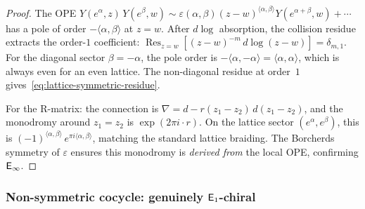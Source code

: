 \begin{proof}
The OPE $Y(e^\alpha,z)\,Y(e^\beta,w) \sim
\varepsilon(\alpha,\beta)(z-w)^{\langle\alpha,\beta\rangle}
Y(e^{\alpha+\beta},w) + \cdots$ has a pole of order
$-\langle\alpha,\beta\rangle$ at $z = w$. After $d\log$ absorption,
the collision residue extracts the order-$1$ coefficient:
$\operatorname{Res}_{z=w}[(z-w)^{-m}\,d\log(z-w)] = \delta_{m,1}$.
For the diagonal sector $\beta = -\alpha$, the pole order is
$-\langle\alpha,-\alpha\rangle = \langle\alpha,\alpha\rangle$, which
is always even for an even lattice. The non-diagonal residue at
order~$1$ gives~\eqref{eq:lattice-symmetric-residue}.

For the R-matrix: the connection is
$\nabla = d - r(z_1-z_2)\,d(z_1 - z_2)$, and the monodromy around
$z_1 = z_2$ is $\exp(2\pi i \cdot r)$. On the lattice sector
$(e^\alpha, e^\beta)$, this is
$(-1)^{\langle\alpha,\beta\rangle}\,
e^{\pi i \langle\alpha,\beta\rangle}$, matching the standard
lattice braiding. The Borcherds symmetry of $\varepsilon$ ensures
this monodromy is \emph{derived from} the local OPE, confirming
$\mathsf{E}_{\infty}$.
\end{proof}

\subsubsection{Non-symmetric cocycle: genuinely \texorpdfstring{$\mathsf{E}_1$}{E1}-chiral}

